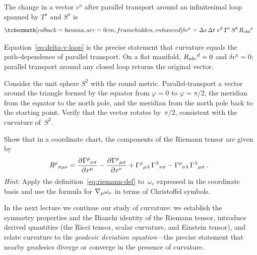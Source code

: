 \begin{keyresult}\label{res:loop-transport}
  The change in a vector $v^a$ after parallel transport around
  an infinitesimal loop spanned by $T^a$ and $S^a$ is
  \begin{equation}\label{eq:delta-v-loop}
    \eqbox{\delta v^a
      = \Delta s\,\Delta t\;
        v^d\,T^c\,S^b\,\Riem_{cbd}{}^a}
  \end{equation}
\end{keyresult}

\begin{remark}
  Equation~\eqref{eq:delta-v-loop} is the precise statement
  that curvature equals the path-dependence of parallel
  transport.  On a flat manifold, $R_{abc}{}^d = 0$ and
  $\delta v^a = 0$: parallel transport around any closed loop
  returns the original vector.
\end{remark}

\begin{exercise}\label{ex:riemann-sphere-holonomy}
  Consider the unit sphere $S^2$ with the round metric.
  Parallel-transport a vector around the triangle formed by the
  equator from $\varphi=0$ to $\varphi=\pi/2$, the meridian
  from the equator to the north pole, and the meridian from the
  north pole back to the starting point.  Verify that the vector
  rotates by~$\pi/2$, consistent with the curvature of~$S^2$.
\end{exercise}

\begin{exercise}\label{ex:riemann-christoffel}
  Show that in a coordinate chart, the components of the
  Riemann tensor are given by
  \[
    R^\rho{}_{\sigma\mu\nu}
      = \frac{\partial^{} \Gamma^{\rho}{}_{\nu\sigma}}{\partial {x^\mu}^{}}
      - \frac{\partial^{} \Gamma^{\rho}{}_{\mu\sigma}}{\partial {x^\nu}^{}}
      + \Gamma^{\rho}{}_{\mu\lambda}\,\Gamma^{\lambda}{}_{\nu\sigma}
      - \Gamma^{\rho}{}_{\nu\lambda}\,\Gamma^{\lambda}{}_{\mu\sigma}\,.
  \]
  \emph{Hint:} Apply the
  definition~\eqref{eq:riemann-def} to~$\omega_c$
  expressed in the coordinate basis and use the formula for
  $\nabla_\mu\omega_\nu$ in terms of Christoffel symbols.
\end{exercise}

\medskip
In the next lecture we continue our study of curvature: we
establish the symmetry properties and the Bianchi identity of the
Riemann tensor, introduce derived quantities (the Ricci tensor,
scalar curvature, and Einstein tensor), and relate curvature to
the \emph{geodesic deviation equation}---the precise statement
that nearby geodesics diverge or converge in the presence of
curvature.
